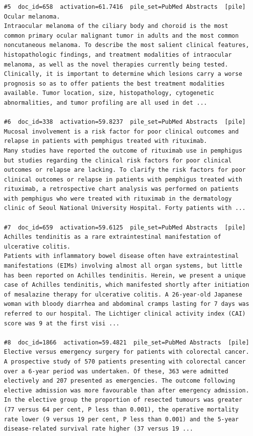 \begin{verbatim}
#5  doc_id=658  activation=61.7416  pile_set=PubMed Abstracts  [pile]
Ocular melanoma.
Intraocular melanoma of the ciliary body and choroid is the most common primary ocular malignant tumor in adults and the most common noncutaneous melanoma. To describe the most salient clinical features, histopathologic findings, and treatment modalities of intraocular melanoma, as well as the novel therapies currently being tested. Clinically, it is important to determine which lesions carry a worse prognosis so as to offer patients the best treatment modalities available. Tumor location, size, histopathology, cytogenetic abnormalities, and tumor profiling are all used in det ...

#6  doc_id=338  activation=59.8237  pile_set=PubMed Abstracts  [pile]
Mucosal involvement is a risk factor for poor clinical outcomes and relapse in patients with pemphigus treated with rituximab.
Many studies have reported the outcome of rituximab use in pemphigus but studies regarding the clinical risk factors for poor clinical outcomes or relapse are lacking. To clarify the risk factors for poor clinical outcomes or relapse in patients with pemphigus treated with rituximab, a retrospective chart analysis was performed on patients with pemphigus who were treated with rituximab in the dermatology clinic of Seoul National University Hospital. Forty patients with ...

#7  doc_id=659  activation=59.6125  pile_set=PubMed Abstracts  [pile]
Achilles tendinitis as a rare extraintestinal manifestation of ulcerative colitis.
Patients with inflammatory bowel disease often have extraintestinal manifestations (EIMs) involving almost all organ systems, but little has been reported on Achilles tendinitis. Herein, we present a unique case of Achilles tendinitis, which manifested shortly after initiation of mesalazine therapy for ulcerative colitis. A 26-year-old Japanese woman with bloody diarrhea and abdominal cramps lasting for 7 days was referred to our hospital. The Lichtiger clinical activity index (CAI) score was 9 at the first visi ...

#8  doc_id=1866  activation=59.4821  pile_set=PubMed Abstracts  [pile]
Elective versus emergency surgery for patients with colorectal cancer.
A prospective study of 570 patients presenting with colorectal cancer over a 6-year period was undertaken. Of these, 363 were admitted electively and 207 presented as emergencies. The outcome following elective admission was more favourable than after emergency admission. In the elective group the proportion of resected tumours was greater (77 versus 64 per cent, P less than 0.001), the operative mortality rate lower (9 versus 19 per cent, P less than 0.001) and the 5-year disease-related survival rate higher (37 versus 19 ...


\end{verbatim}
